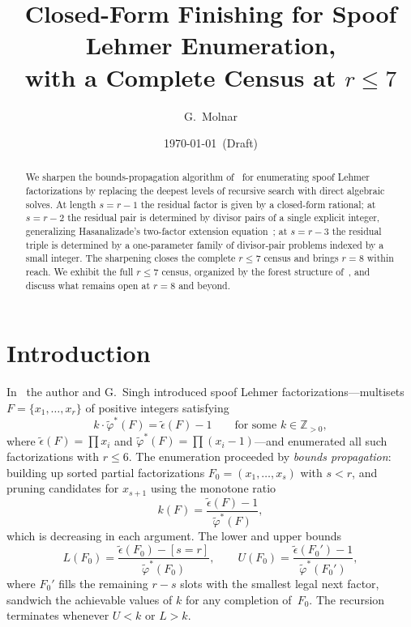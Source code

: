 \documentclass[11pt]{article}
\title{Closed-Form Finishing for Spoof Lehmer Enumeration,\\
with a Complete Census at $r \le 7$}
\author{G.~Molnar}
\date{\today~(Draft)}
\theoremstyle{definition}
\theoremstyle{remark}
\newcommand{\eps}{\tilde{\epsilon}}
\newcommand{\phist}{\tilde{\varphi}^*}
\newcommand{\Z}{\mathbb{Z}}
\begin{document}
\maketitle

\begin{abstract}
We sharpen the bounds-propagation algorithm of~\cite{MS26} for
enumerating spoof Lehmer factorizations by replacing the deepest
levels of recursive search with direct algebraic solves. At length
$s = r - 1$ the residual factor is given by a closed-form rational;
at $s = r - 2$ the residual pair is determined by divisor pairs of a
single explicit integer, generalizing Hasanalizade's two-factor
extension equation~\cite{H26}; at $s = r - 3$ the residual triple
is determined by a one-parameter family of divisor-pair problems
indexed by a small integer. The sharpening closes the complete $r \le 7$
census and brings $r = 8$ within reach. We exhibit the full $r \le 7$
census, organized by the forest structure of~\cite{MFT}, and
discuss what remains open at $r = 8$ and beyond.
\end{abstract}


\section{Introduction}

In~\cite{MS26} the author and G.~Singh introduced spoof Lehmer
factorizations---multisets $F = \{x_1, \ldots, x_r\}$ of positive
integers satisfying
\begin{equation}\label{eq:lehmer}
  k \cdot \phist(F) = \eps(F) - 1
  \qquad\text{for some } k \in \Z_{>0},
\end{equation}
where $\eps(F) = \prod x_i$ and $\phist(F) = \prod(x_i - 1)$---and
enumerated all such factorizations with $r \le 6$. The enumeration
proceeded by \emph{bounds propagation}: building up sorted partial
factorizations $F_0 = (x_1, \ldots, x_s)$ with $s < r$, and pruning
candidates for $x_{s+1}$ using the monotone ratio
\begin{equation}\label{eq:ratio}
  k(F) = \frac{\eps(F) - 1}{\phist(F)},
\end{equation}
which is decreasing in each argument. The lower and upper bounds
\[
  L(F_0) = \frac{\eps(F_0) - [s = r]}{\phist(F_0)},
  \qquad
  U(F_0) = \frac{\eps(F_0') - 1}{\phist(F_0')},
\]
where $F_0'$ fills the remaining $r - s$ slots with the smallest legal
next factor, sandwich the achievable values of $k$ for any completion
of~$F_0$. The recursion terminates whenever $U < k$ or $L > k$.
\end{document}
